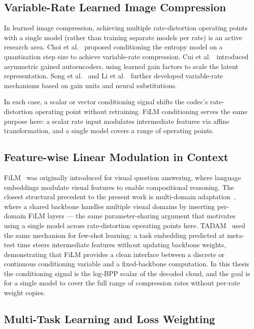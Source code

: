 \subsection{Variable-Rate Learned Image Compression}

In learned image compression, achieving multiple rate-distortion operating
points with a single model (rather than training separate models per rate)
is an active research area.
Choi et al.~\cite{choi2019variable} proposed conditioning the entropy model
on a quantisation step size to achieve variable-rate compression.
Cui et al.~\cite{cui2021asymmetric} introduced asymmetric gained autoencoders,
using learned gain factors to scale the latent representation.
Song et al.~\cite{song2021variable} and Li et al.~\cite{li2024neural} further
developed variable-rate mechanisms based on gain units and neural substitutions.

In each case, a scalar or vector conditioning signal shifts the codec's
rate-distortion operating point without retraining.
FiLM conditioning serves the same purpose here: a scalar rate input modulates
intermediate features via affine transformation, and a single model covers a
range of operating points.

\subsection{Feature-wise Linear Modulation in Context}

FiLM~\cite{perez2018film} was originally introduced for visual question
answering, where language embeddings modulate visual features to enable
compositional reasoning.
The closest structural precedent to the present work is multi-domain
adaptation~\cite{rebuffi2018efficient}, where a shared backbone handles
multiple visual domains by inserting per-domain FiLM layers --- the same
parameter-sharing argument that motivates using a single model across
rate-distortion operating points here.
TADAM~\cite{oreshkin2018tadam} used the same mechanism for few-shot learning:
a task embedding predicted at meta-test time steers intermediate features
without updating backbone weights, demonstrating that FiLM provides a
clean interface between a discrete or continuous conditioning variable and
a fixed-backbone computation.
In this thesis the conditioning signal is the log-BPP scalar of the decoded
cloud, and the goal is for a single model to cover the full range of
compression rates without per-rate weight copies.

\subsection{Multi-Task Learning and Loss Weighting}

